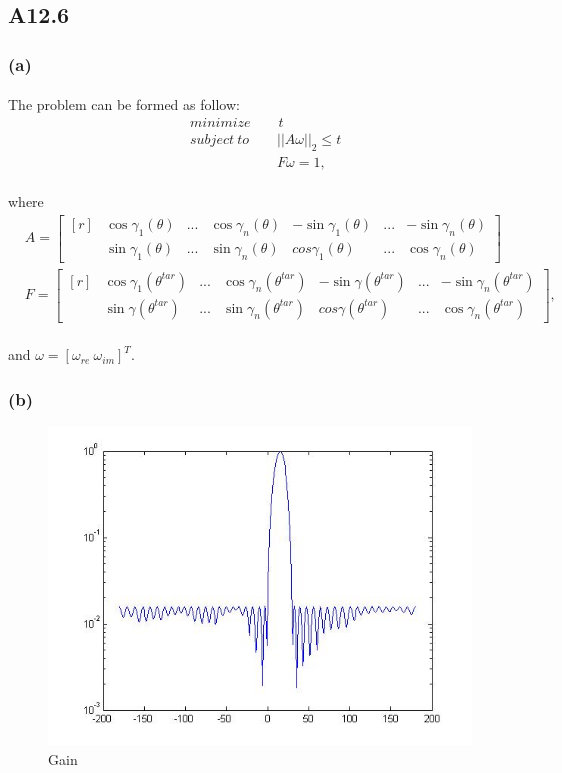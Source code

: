 \subsection*{A12.6}
\subsubsection*{(a)}
\paragraph{}
The problem can be formed as follow:
\begin{align*}
	&minimize \qquad t\\
	&subject\ to \qquad ||A\omega||_2 \leq t\\
	&\qquad \qquad \qquad \ F\omega = 1,
\end{align*}
\paragraph{}
where
\begin{align*}
&A = \begin{bmatrix*}[r]
&\cos\gamma_1(\theta)&...&\cos\gamma_n(\theta) & -\sin\gamma_1(\theta)&...&-\sin\gamma_n(\theta)\\
&\sin\gamma_1(\theta)&...&\sin\gamma_n(\theta) & cos\gamma_1(\theta)&...&\cos\gamma_n(\theta)
\end{bmatrix*} \\
&F = \begin{bmatrix*}[r]
&\cos\gamma_1(\theta^{tar})&...&\cos\gamma_n(\theta^{tar}) & -\sin\gamma(\theta^{tar})&...&-\sin\gamma_n(\theta^{tar})\\
&\sin\gamma(\theta^{tar})&...&\sin\gamma_n(\theta^{tar}) & cos\gamma(\theta^{tar})&...&\cos\gamma_n(\theta^{tar})
\end{bmatrix*},
\end{align*}
\paragraph{}
and $\omega = [\omega_{re} \ \omega_{im}]^T$.
\subsubsection*{(b)}

\begin{figure}
	\centering
	\includegraphics[scale=0.7]{est.jpg}
	\caption{Gain}
\end{figure}